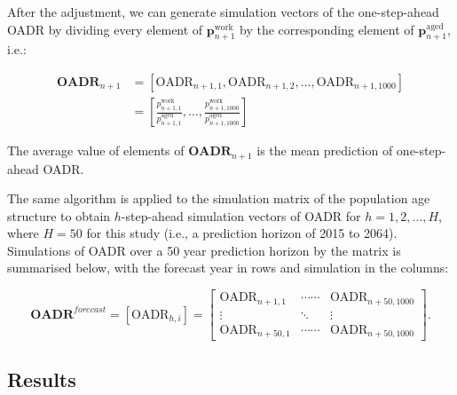 \documentclass[11pt,a4paper,]{article}
\begin{document}
After the adjustment, we can generate simulation vectors of the
one-step-ahead OADR by dividing every element of
\(\bm{p}^{\text{work}}_{n+1}\) by the corresponding element of
\(\bm{p}^{\text{aged}}_{n+1}\), i.e.:

\begin{align*}
  \bm{\text{OADR}}_{n+1} & = \left[\text{OADR}_{n+1,1},\text{OADR}_{n+1,2},\dots,\text{OADR}_{n+1,1000}\right]\\
                  & = \left[\frac{p^{\text{work}}_{n+1,1}}{p^{\text{aged}}_{n+1,1}},\dots,\frac{p^{\text{work}}_{n+1,1000}}{p^{\text{aged}}_{n+1,1000}}\right]
\end{align*}

The average value of elements of \(\bm{\text{OADR}}_{n+1}\) is the mean
prediction of one-step-ahead OADR.

The same algorithm is applied to the simulation matrix of the population
age structure to obtain \(h\)-step-ahead simulation vectors of OADR for
\(h=1,2,\dots,H\), where \(H=50\) for this study (i.e., a prediction
horizon of 2015 to 2064). Simulations of OADR over a 50 year prediction
horizon by the matrix is summarised below, with the forecast year in
rows and simulation in the columns:

\begin{equation}
  \bm{\text{OADR}}^{forecast}=\left[\text{OADR}_{h,i}\right] =
  \begin{bmatrix}
    \text{OADR}_{n+1,1} & \cdots\cdots & \text{OADR}_{n+50,1000} \\
    \vdots & \ddots & \vdots \\
    \text{OADR}_{n+50,1} & \cdots\cdots & \text{OADR}_{n+50,1000}
  \end{bmatrix}.
\end{equation}

\subsection{Results}\label{results}
\end{document}
